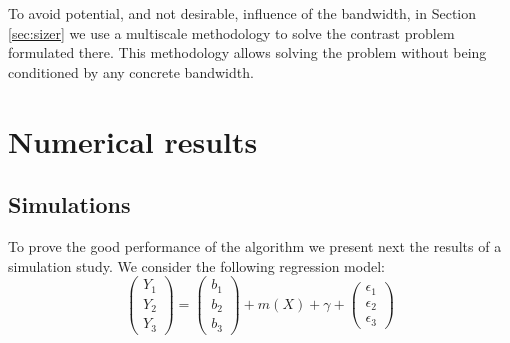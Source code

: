 \documentclass[sn-mathphys]{sn-jnl}%
\theoremstyle{thmstyleone}%
\theoremstyle{thmstyletwo}%
\theoremstyle{thmstylethree}%
\begin{document}
To avoid potential, and not desirable, influence of the bandwidth, in Section \ref{sec:sizer} we use a multiscale methodology to solve the contrast problem formulated there. This methodology allows solving the problem without being conditioned by any concrete bandwidth.



\section{Numerical results}\label{sec:result}

\subsection{Simulations}\label{sec:simu}
To prove the good performance of the algorithm we present next the results of a simulation study. We consider the following regression model:
\begin{equation}\label{eq:model}
	\left(\begin{array}{c}
		Y_{1} \\
		Y_2 \\
		Y_3 \end{array}\right) =
	\left(\begin{array}{c}
		b_{1} \\
		b_2 \\
		b_3 \end{array}\right) +m(X) + \gamma + \left(\begin{array}{c}
		\epsilon_{1} \\
		\epsilon_2 \\
		\epsilon_3 \end{array}\right)
\end{equation}
\end{document}
